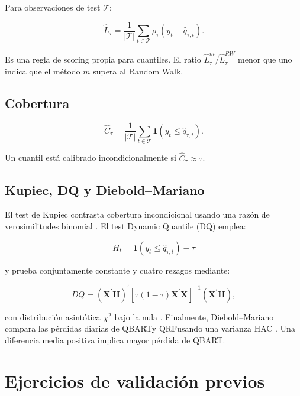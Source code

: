 \documentclass[11pt,a4paper]{article}
\newcommand{\qbart}{\textsc{QBART}}
\newcommand{\qrf}{\textsc{QRF}}
\begin{document}
Para observaciones de test \(\mathcal T\):

\begin{equation}
  \widehat L_{\tau}
  =
  \frac{1}{|\mathcal T|}
  \sum_{t\in\mathcal T}
  \rho_{\tau}
  \left(y_t-\widehat q_{\tau,t}\right).
\end{equation}

Es una regla de scoring propia para cuantiles. El ratio
\(\widehat L_{\tau}^{m}/\widehat L_{\tau}^{RW}\) menor que uno indica que el
método \(m\) supera al Random Walk.

\subsection{Cobertura}

\begin{equation}
  \widehat C_{\tau}
  =
  \frac{1}{|\mathcal T|}
  \sum_{t\in\mathcal T}
  \mathbf{1}
  \left(y_t\leq\widehat q_{\tau,t}\right).
\end{equation}

Un cuantil está calibrado incondicionalmente si
\(\widehat C_{\tau}\approx\tau\).

\subsection{Kupiec, DQ y Diebold--Mariano}

El test de Kupiec contrasta cobertura incondicional usando una razón de
verosimilitudes binomial \cite{kupiec1995}. El test Dynamic Quantile (DQ)
emplea:

\begin{equation}
  H_t=\mathbf{1}(y_t\leq\widehat q_{\tau,t})-\tau
\end{equation}

y prueba conjuntamente constante y cuatro rezagos mediante:

\begin{equation}
  DQ
  =
  (\bm X^{\prime}\bm H)^{\prime}
  \left[
  \tau(1-\tau)\bm X^{\prime}\bm X
  \right]^{-1}
  (\bm X^{\prime}\bm H),
\end{equation}

con distribución asintótica \(\chi^2\) bajo la nula
\cite{englemanganelli2004}. Finalmente, Diebold--Mariano compara las pérdidas
diarias de \qbart y \qrf usando una varianza HAC
\cite{dieboldmariano1995}. Una diferencia media positiva implica mayor
pérdida de \qbart.

\section{Ejercicios de validación previos}
\end{document}
